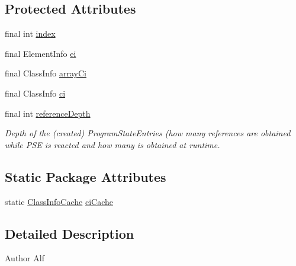 \subsection*{Protected Attributes}
\begin{DoxyCompactItemize}
\item 
final int \hyperlink{classgov_1_1nasa_1_1jpf_1_1inspector_1_1server_1_1programstate_1_1_state_value_array_element_aa6411af2bddb25d2f9e779b08063e9e5}{index}
\item 
final Element\+Info \hyperlink{classgov_1_1nasa_1_1jpf_1_1inspector_1_1server_1_1programstate_1_1_state_value_array_element_a6173229e69d8b4dfecb57a30187a72bc}{ei}
\item 
final Class\+Info \hyperlink{classgov_1_1nasa_1_1jpf_1_1inspector_1_1server_1_1programstate_1_1_state_value_array_element_ad155b9daab791f6835f8b9a7fd793a72}{array\+Ci}
\item 
final Class\+Info \hyperlink{classgov_1_1nasa_1_1jpf_1_1inspector_1_1server_1_1programstate_1_1_state_value_a0eb4aa1e630ed6372dcfb8c41ae7edc5}{ci}
\item 
final int \hyperlink{classgov_1_1nasa_1_1jpf_1_1inspector_1_1server_1_1programstate_1_1_state_node_a55683618625dae46e8aa68d95811d6bb}{reference\+Depth}
\begin{DoxyCompactList}\small\item\em Depth of the (created) Program\+State\+Entries (how many references are obtained while P\+SE is reacted and how many is obtained at runtime. \end{DoxyCompactList}\end{DoxyCompactItemize}
\subsection*{Static Package Attributes}
\begin{DoxyCompactItemize}
\item 
static \hyperlink{classgov_1_1nasa_1_1jpf_1_1inspector_1_1utils_1_1_class_info_cache}{Class\+Info\+Cache} \hyperlink{classgov_1_1nasa_1_1jpf_1_1inspector_1_1server_1_1programstate_1_1_state_value_a38182b5018580765f3f2cdc9e96e1ca2}{ci\+Cache}
\end{DoxyCompactItemize}


\subsection{Detailed Description}
\begin{DoxyAuthor}{Author}
Alf 
\end{DoxyAuthor}


